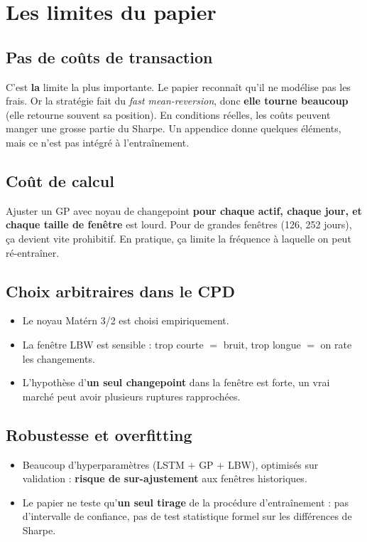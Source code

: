 \documentclass[11pt,a4paper]{article}
\begin{document}
\section{Les limites du papier}

\subsection{Pas de coûts de transaction}
C'est \textbf{la} limite la plus importante. Le papier reconnaît qu'il ne modélise pas les frais. Or la stratégie fait du \emph{fast mean-reversion}, donc \textbf{elle tourne beaucoup} (elle retourne souvent sa position). En conditions réelles, les coûts peuvent manger une grosse partie du Sharpe. Un appendice donne quelques éléments, mais ce n'est pas intégré à l'entraînement.

\subsection{Coût de calcul}
Ajuster un GP avec noyau de changepoint \textbf{pour chaque actif, chaque jour, et chaque taille de fenêtre} est lourd. Pour de grandes fenêtres (126, 252 jours), ça devient vite prohibitif. En pratique, ça limite la fréquence à laquelle on peut ré-entraîner.

\subsection{Choix arbitraires dans le CPD}
\begin{itemize}[leftmargin=*]
    \item Le noyau Matérn 3/2 est choisi empiriquement.
    \item La fenêtre LBW est sensible : trop courte $=$ bruit, trop longue $=$ on rate les changements.
    \item L'hypothèse d'\textbf{un seul changepoint} dans la fenêtre est forte, un vrai marché peut avoir plusieurs ruptures rapprochées.
\end{itemize}

\subsection{Robustesse et overfitting}
\begin{itemize}[leftmargin=*]
    \item Beaucoup d'hyperparamètres (LSTM $+$ GP $+$ LBW), optimisés sur validation : \textbf{risque de sur-ajustement} aux fenêtres historiques.
    \item Le papier ne teste qu'\textbf{un seul tirage} de la procédure d'entraînement : pas d'intervalle de confiance, pas de test statistique formel sur les différences de Sharpe.
\end{itemize}
\end{document}
